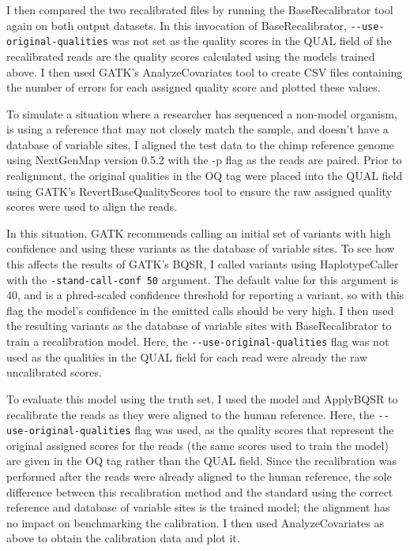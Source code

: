 I then compared the two recalibrated files by running the BaseRecalibrator tool again on both output datasets. In this invocation of BaseRecalibrator, \texttt{-\phantom{}-use-original-qualities} was not set as the quality scores in the QUAL field of the recalibrated reads are the quality scores calculated using the models trained above. I then used GATK's AnalyzeCovariates tool to create CSV files containing the number of errors for each assigned quality score and plotted these values.

To simulate a situation where a researcher has sequenced a non-model organism, is using a reference that may not closely match the sample, and doesn't have a database of variable sites, I aligned the test data to the chimp reference genome \parencite{waterson_initial_2005} using NextGenMap \parencite{sedlazeck_nextgenmap_2013} version 0.5.2 with the -p flag as the reads are paired. Prior to realignment, the original qualities in the OQ tag were placed into the QUAL field using GATK's RevertBaseQualityScores tool to ensure the raw assigned quality scores were used to align the reads.

In this situation, GATK recommends calling an initial set of variants with high confidence and using these variants as the database of variable sites. %
To see how this affects the results of GATK's BQSR, I called variants using HaplotypeCaller with the \texttt{-stand-call-conf 50} argument. The default value for this argument is 40, and is a phred-scaled confidence threshold for reporting a variant, so with this flag the model's confidence in the emitted calls should be very high. I then used the resulting variants as the database of variable sites with BaseRecalibrator to train a recalibration model. Here, the \texttt{-\phantom{}-use-original-qualities} flag was not used as the qualities in the QUAL field for each read were already the raw uncalibrated scores.

To evaluate this model using the truth set, I used the model and ApplyBQSR to recalibrate the reads as they were aligned to the human reference. Here, the \texttt{-\phantom{}-use-original-qualities} flag was used, as the quality scores that represent the original assigned scores for the reads (the same scores used to train the model) are given in the OQ tag rather than the QUAL field. Since the recalibration was performed after the reads were already aligned to the human reference, the sole difference between this recalibration method and the standard using the correct reference and database of variable sites is the trained model; the alignment has no impact on benchmarking the calibration. I then used AnalyzeCovariates as above to obtain the calibration data and plot it.

